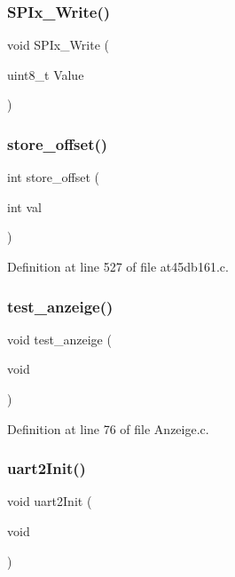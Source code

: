 \subsubsection{S\+P\+Ix\+\_\+\+Write()}
{\footnotesize\ttfamily void S\+P\+Ix\+\_\+\+Write (\begin{DoxyParamCaption}\item[{uint8\+\_\+t}]{Value }\end{DoxyParamCaption})}

\mbox{\label{main_8c_a0d1acbab3520ceb76b879ed1b0186230}} 
\subsubsection{store\+\_\+offset()}
{\footnotesize\ttfamily int store\+\_\+offset (\begin{DoxyParamCaption}\item[{int}]{val }\end{DoxyParamCaption})}



Definition at line 527 of file at45db161.\+c.

\mbox{\label{main_8c_ab1867dec374e397f64ee229d3df859da}} 
\subsubsection{test\+\_\+anzeige()}
{\footnotesize\ttfamily void test\+\_\+anzeige (\begin{DoxyParamCaption}\item[{void}]{ }\end{DoxyParamCaption})}



Definition at line 76 of file Anzeige.\+c.

\mbox{\label{main_8c_a084e270b15f2aa6e0beebda5d92976fd}} 
\subsubsection{uart2\+Init()}
{\footnotesize\ttfamily void uart2\+Init (\begin{DoxyParamCaption}\item[{void}]{ }\end{DoxyParamCaption})}



